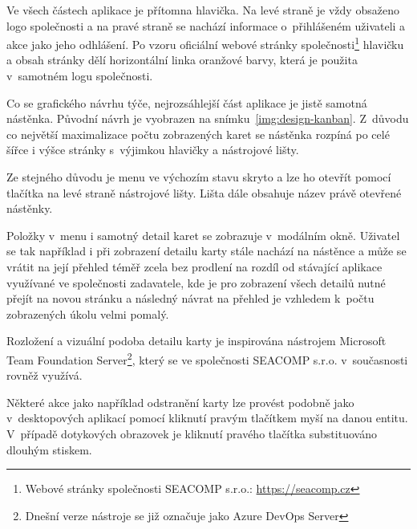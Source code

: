 Ve všech částech aplikace je přítomna hlavička. Na levé straně je vždy obsaženo logo společnosti a na pravé straně se nachází informace o~přihlášeném uživateli a akce jako jeho odhlášení. Po vzoru oficiální webové stránky společnosti\footnote{Webové stránky společnosti SEACOMP s.r.o.: \url{https://seacomp.cz}} hlavičku a obsah stránky dělí horizontální linka oranžové barvy, která je použita v~samotném logu společnosti.

Co se grafického návrhu týče, nejrozsáhlejší část aplikace je jistě samotná nástěnka. Původní návrh je vyobrazen na snímku~\ref{img:design-kanban}. Z~důvodu co největší maximalizace počtu zobrazených karet se nástěnka rozpíná po celé šířce i výšce stránky s~výjimkou hlavičky a nástrojové lišty.

Ze stejného důvodu je menu ve výchozím stavu skryto a lze ho otevřít pomocí tlačítka na levé straně nástrojové lišty. Lišta dále obsahuje název právě otevřené nástěnky.

Položky v~menu i samotný detail karet se zobrazuje v~modálním okně. Uživatel se tak například i při zobrazení detailu karty stále nachází na nástěnce a může se vrátit na její přehled téměř zcela bez prodlení na rozdíl od stávající aplikace využívané ve společnosti zadavatele, kde je pro zobrazení všech detailů nutné přejít na novou stránku a následný návrat na přehled je vzhledem k~počtu zobrazených úkolu velmi pomalý.

Rozložení a vizuální podoba detailu karty je inspirována nástrojem Microsoft Team Foundation Server\footnote{Dnešní verze nástroje se již označuje jako Azure DevOps Server}, který se ve společnosti SEACOMP s.r.o. v~současnosti rovněž využívá.

Některé akce jako například odstranění karty lze provést podobně jako v~desktopových aplikací pomocí kliknutí pravým tlačítkem myší na danou entitu. V~případě dotykových obrazovek je kliknutí pravého tlačítka substituováno dlouhým stiskem. 

